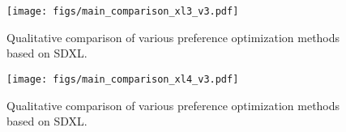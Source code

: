 \begin{figure}[p]
    \centering
    \texttt{[image: figs/main\_comparison\_xl3\_v3.pdf]}
    \vspace{-10pt}
    \caption{Qualitative comparison of various preference optimization methods based on SDXL.}
    \label{fig:vis_xl_3}
\end{figure}


\begin{figure}[p]
    \centering
    \texttt{[image: figs/main\_comparison\_xl4\_v3.pdf]}
    \vspace{-10pt}
    \caption{Qualitative comparison of various preference optimization methods based on SDXL.}
    \label{fig:vis_xl_4}
\end{figure}
